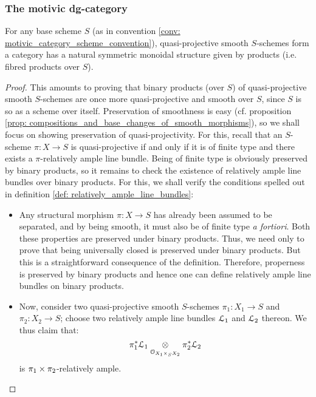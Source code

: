             \subsubsection{The motivic dg-category}
                \begin{claim}
                    For any base scheme $S$ (as in convention \ref{conv: motivic_category_scheme_convention}), quasi-projective smooth $S$-schemes form a category has a natural symmetric monoidal structure given by products (i.e. fibred products over $S$).
                \end{claim}
                    \begin{proof}
                        This amounts to proving that binary products (over $S$) of quasi-projective smooth $S$-schemes are once more quasi-projective and smooth over $S$, since $S$ is so as a scheme over itself. Preservation of smoothness is easy (cf. proposition \ref{prop: compositions_and_base_changes_of_smooth_morphisms}), so we shall focus on showing preservation of quasi-projectivity. For this, recall that an $S$-scheme $\pi: X \to S$ is quasi-projective if and only if it is of finite type and there exists a $\pi$-relatively ample line bundle. Being of finite type is obviously preserved by binary products, so it remains to check the existence of relatively ample line bundles over binary products. For this, we shall verify the conditions spelled out in definition \ref{def: relatively_ample_line_bundles}:
                            \begin{itemize}
                                \item Any structural morphism $\pi: X \to S$ has already been assumed to be separated, and by being smooth, it must also be of finite type \textit{a fortiori}. Both these properties are preserved under binary products. Thus, we need only to prove that being universally closed is preserved under binary products. But this is a straightforward consequence of the definition. Therefore, properness is preserved by binary products and hence one can define relatively ample line bundles on binary products.
                                \item Now, consider two quasi-projective smooth $S$-schemes $\pi_1: X_1 \to S$ and $\pi_2: X_2 \to S$; choose two relatively ample line bundles $\mathcal{L}_1$ and $\mathcal{L}_2$ thereon. We thus claim that:
                                    $$\pi_1^*\calL_1 \tensor_{\calO_{X_1 \x_S X_2}} \pi_2^*\calL_2$$
                                is $\pi_1 \x \pi_2$-relatively ample. 
                            \end{itemize}
                    \end{proof}
            
